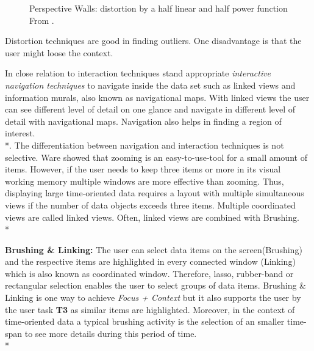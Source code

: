 \begin{figure}[H]
    \centering
    \caption{Perspective Walls: distortion by a half linear and half power function From \cite{Stroe1999}.}
    \label{fig:perspectivewall}
\end{figure}
Distortion techniques are good in finding outliers. One disadvantage is that the user might loose the context.
\par

\label{navigation}
In close relation to interaction techniques stand appropriate \textit{interactive navigation techniques} to navigate inside the data set such as linked views and information murals, also known as navigational maps\cite{Jerding1998}. With linked views the user can see different level of detail on one glance and navigate in different level of detail with navigational maps. Navigation also helps in finding a region of interest.\\*. The differentiation between navigation and interaction techniques is not selective.
\label{zoomingVsmultiple}
Ware\cite{Ware2012} showed that zooming is an easy-to-use-tool for a small amount of items. However, if the user needs to keep three items or more in its visual working memory multiple windows are more effective than zooming. Thus, displaying large time-oriented data requires a layout with multiple simultaneous views if the number of data objects exceeds three items. Multiple coordinated views are called linked views. Often, linked views are combined with Brushing. \\*

\textbf{Brushing \& Linking: }The user can select data items on the screen(Brushing) and the respective items are highlighted in every connected window (Linking) which is also known as coordinated window. Therefore, lasso, rubber-band or rectangular selection enables the user to select groups of data items\cite{tegarden1999, Aigner2011}. Brushing \& Linking is one way to achieve \textit{Focus + Context} but it also supports the user by the user task \textbf{T3} as similar items are highlighted. Moreover, in the context of time-oriented data a typical brushing activity is the selection of an smaller time-span to see more details during this period of time. 
\\*

